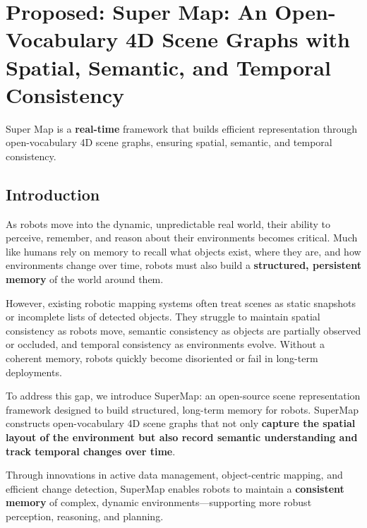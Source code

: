 \chapter{Proposed: Super Map: An Open-Vocabulary 4D Scene Graphs with Spatial, Semantic, and Temporal Consistency}
\label{chapter:supermap}

\begin{framed} 
Super Map is a \textbf{real-time} framework that builds efficient representation
through open-vocabulary 4D scene graphs, ensuring spatial, semantic, and temporal consistency.
\end{framed}


\section{Introduction}

As robots move into the dynamic, unpredictable real world, their ability to perceive, remember, and reason about their environments becomes critical. Much like humans rely on memory to recall what objects exist, where they are, and how environments change over time, robots must also build a \textbf{structured, persistent memory} of the world around them.

However, existing robotic mapping systems often treat scenes as static snapshots or incomplete lists of detected objects. They struggle to maintain spatial consistency as robots move, semantic consistency as objects are partially observed or occluded, and temporal consistency as environments evolve. Without a coherent memory, robots quickly become disoriented or fail in long-term deployments.

To address this gap, we introduce SuperMap: an open-source scene representation framework designed to build structured, long-term memory for robots. SuperMap constructs open-vocabulary 4D scene graphs that not only \textbf{capture the spatial layout of the environment but also record semantic understanding and track temporal changes over time}. 

Through innovations in active data management, object-centric mapping, and efficient change detection, SuperMap enables robots to maintain a \textbf{consistent memory} of complex, dynamic environments—supporting more robust perception, reasoning, and planning.





